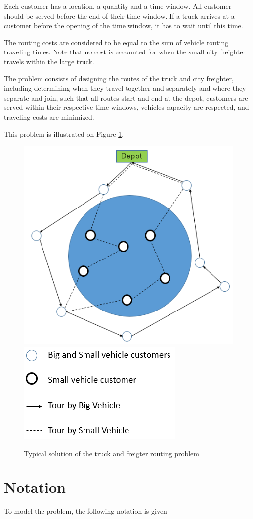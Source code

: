 \documentclass[dvipsnames,authoryear,11pt]{article}
\begin{document}
Each customer has a location, a quantity and a time window. All customer should be served before the end of their time window. 
If a truck arrives at a customer before the opening of the time window, it has to wait until this time. 

The routing costs are considered to be equal to the sum of vehicle routing traveling times. 
Note that no cost is accounted for when the small city freighter travels within the large truck. 

The problem consists of designing the routes of the truck and city freighter, including determining when they travel together and separately and where they separate and join, such that all routes start and end at the depot, customers are served within their respective time windows, vehicles capacity are respected, and traveling costs are minimized. 

This problem is illustrated on Figure \ref{fig:fig1}.

\begin{figure}[h]
	\centering
	\includegraphics[width=0.6\linewidth]{figure}
	\includegraphics[width=0.3\linewidth]{legende}
	\caption{Typical solution of the truck and freigter routing problem}
	\label{fig:fig1}
\end{figure}

\section{Notation}
	
To model the problem, the following notation is given 
\end{document}
